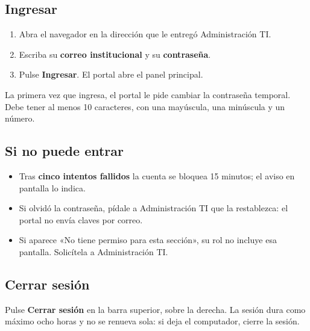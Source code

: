 \subsection{Ingresar}

\begin{enumerate}[leftmargin=*,itemsep=0.2em]
\item Abra el navegador en la dirección que le entregó Administración TI.
\item Escriba su \textbf{correo institucional} y su \textbf{contraseña}.
\item Pulse \textbf{Ingresar}. El portal abre el panel principal.
\end{enumerate}


La primera vez que ingresa, el portal le pide cambiar la contraseña temporal.
Debe tener al menos 10 caracteres, con una mayúscula, una minúscula y un
número.

\subsection{Si no puede entrar}

\begin{itemize}[leftmargin=*,itemsep=0.2em]
\item Tras \textbf{cinco intentos fallidos} la cuenta se bloquea 15 minutos;
  el aviso en pantalla lo indica.
\item Si olvidó la contraseña, pídale a Administración TI que la restablezca:
  el portal no envía claves por correo.
\item Si aparece «No tiene permiso para esta sección», su rol no incluye esa
  pantalla. Solicítela a Administración TI.
\end{itemize}

\subsection{Cerrar sesión}

Pulse \textbf{Cerrar sesión} en la barra superior, sobre la derecha. La sesión
dura como máximo ocho horas y no se renueva sola: si deja el computador,
cierre la sesión.
